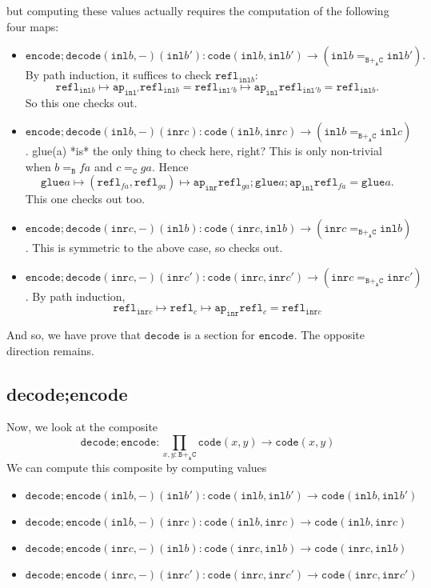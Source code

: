 \documentclass[12pt]{amsart}
\newcommand{\from}{\colon}
\newcommand{\edit}[1]{{\color{red} #1 }}
\newcommand{\type}[1]{\mathtt{#1}}
\newcommand{\tin}{\colon}
\newcommand{\A}{\type{A}}
\newcommand{\B}{\type{B}}
\newcommand{\C}{\type{C}}
\newcommand{\BAC}{\B +_{\A} \C}
\newcommand{\ap}{\type{ap}}
\newcommand{\inl}{\type{inl}}
\newcommand{\inr}{\type{inr}}
\newcommand{\glue}{\type{glue}}
\newcommand{\refl}{\type{refl}}
\newcommand{\code}{\type{code}}
\newcommand{\encode}{\type{encode}}
\newcommand{\decode}{\type{decode}}
\theoremstyle{remark}
\theoremstyle{definition}
\begin{document}
but computing these values actually requires the computation of the
following four maps:
\begin{itemize}
\item
  \( \encode ; \decode ( \inl b , - )(\inl b') \from \code ( \inl b ,
  \inl b' ) \to ( \inl b =_{\BAC}
  \inl b' ). \) By path
  induction, it suffices to check \( \refl_{\inl b} \):
  \[
    \refl_{\inl b} \mapsto \ap_{\inl'} \refl_{\inl b}
    = \refl_{\inl' b} \mapsto \ap_{\inl} \refl_{\inl' b} =
    \refl_{\inl b}.
  \]
  So this one checks out.
\item
  \( \encode ; \decode ( \inl b , - )(\inr c) \from \code ( \inl b ,
  \inr c ) \to ( \inl b =_{\BAC} \inl c ) \). \edit{glue(a) *is* the
    only thing to check here, right?} This is only non-trivial when
  \( b =_\B fa \) and \( c =_\C ga \). Hence
  \[
    \glue a \mapsto ( \refl_{fa} , \refl_{ga} ) \mapsto \ap_{\inr}
    \refl_{ga} ; \glue a ; \ap_{\inl} \refl_{fa} = \glue a.
  \]
  This one checks out too.
\item
  \( \encode ; \decode ( \inr c , - )(\inl b) \from \code ( \inr c ,
  \inl b ) \to ( \inr c =_{\BAC} \inl b ) \). This is
  symmetric to the above case, so checks out. 
\item
  \( \encode ; \decode ( \inr c , - )(\inr c') \from \code ( \inr c,
  \inr c' ) \to ( \inr c =_{\BAC} \inr c' ) \). By path
  induction, 
  \[
    \refl_{\inr c} \mapsto \refl_c \mapsto \ap_{\inr} \refl_c =
    \refl_{\inr c}
  \]  
\end{itemize}

And so, we have prove that \( \decode \) is a section for \( \encode
\). The opposite direction remains.

\subsection{decode;encode}

Now, we look at the composite
\[
  \decode ; \encode
  \from
  \prod\limits_{x,y \tin \BAC} \code ( x,y )
  \to
  \code ( x,y )
\]
We can compute this composite by computing values

\begin{itemize}
\item
  \( \decode ; \encode (\inl b , -) ( \inl b' ) \from \code ( \inl b ,
  \inl b' ) \to \code ( \inl b , \inl b' ) \)
\item
  \( \decode ; \encode (\inl b , -) ( \inr c ) \from \code ( \inl b ,
  \inr c ) \to \code ( \inl b , \inr c ) \)
\item
  \( \decode ; \encode (\inr c , -) ( \inl b ) \from \code ( \inr c ,
  \inl b ) \to \code ( \inr c , \inl b ) \)
\item
  \( \decode ; \encode (\inr c , -) ( \inr c' ) \from \code ( \inr c ,
  \inr c' ) \to \code ( \inr c , \inr c' ) \)
\end{itemize}
\end{document}
